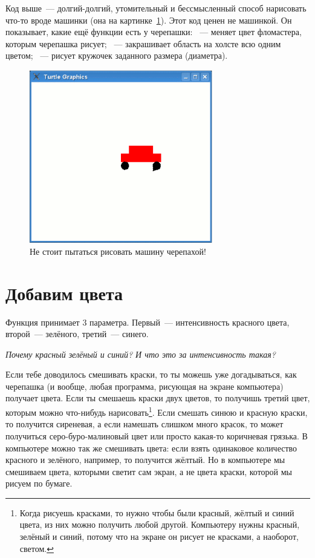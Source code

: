 Код выше — долгий-долгий, утомительный и бессмысленный способ нарисовать что-то вроде машинки (она на картинке \ref{fig24}). Этот код ценен не машинкой. Он показывает, какие ещё функции есть у черепашки:  — меняет цвет фломастера, которым черепашка рисует;  — закрашивает область на холсте всю одним цветом;  — рисует кружочек заданного размера (диаметра).

\begin{figure}
\begin{center}
\includegraphics[width=80mm]{../en/figure24.eps}
\end{center}
\caption{Не стоит пытаться рисовать машину черепахой!}\label{fig24}
\end{figure}

\section{Добавим цвета}

Функция  принимает 3 параметра. Первый — интенсивность красного цвета, второй — зелёного, третий — синего.

\emph{Почему красный зелёный и синий? И что это за интенсивность такая?}

Если тебе доводилось смешивать краски, то ты можешь уже догадываться, как черепашка (и вообще, любая программа, рисующая на экране компьютера) получает цвета. Если ты смешаешь краски двух цветов, то получишь третий цвет, которым можно что-нибудь нарисовать\footnote{Когда рисуешь красками, то нужно чтобы были красный, жёлтый и синий цвета, из них можно получить любой другой. Компьютеру нужны красный, зелёный и синий, потому что на экране он рисует не красками, а наоборот, светом.}. Если смешать синюю и красную краски, то получится сиреневая, а если намешать слишком много красок, то может получиться серо-буро-малиновый цвет или просто какая-то коричневая грязька. В компьютере можно так же смешивать цвета: если взять одинаковое количество красного и зелёного, например, то получится жёлтый. Но в компьютере мы смешиваем цвета, которыми светит сам экран, а не цвета краски, которой мы рисуем по бумаге.

